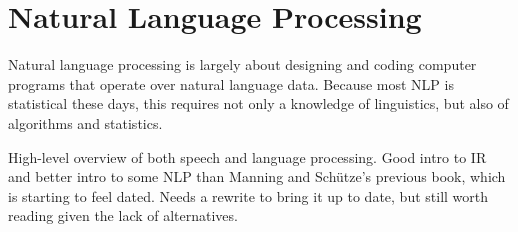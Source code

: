 \section{Natural Language Processing}

\noindent
Natural language processing is largely about designing and coding computer
programs that operate over natural language data.  Because most NLP is
statistical these days, this requires not only a knowledge of linguistics,
but also of algorithms and statistics.

\begin{itemize}
{High-level overview of both speech and language
processing.}
%
{Good intro to IR and better intro to some NLP than
Manning and Sch\"utze's previous book, which is starting to feel
dated.}
%
{Needs a rewrite to bring it up to date, but still
worth reading given the lack of alternatives.}
\end{itemize}

